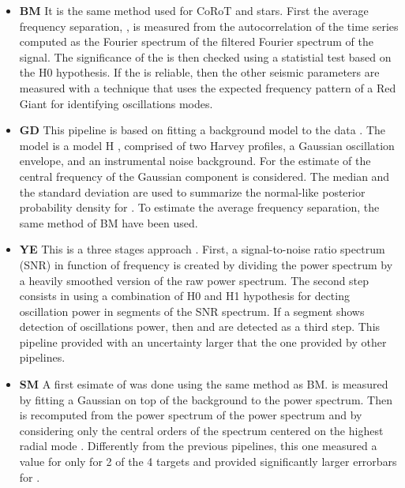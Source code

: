 \documentclass{aa}
\begin{document}
\begin{itemize}
\item {\bf BM} It is the same method used for CoRoT and \kepler stars\citealp{Mosser2009, Mosser2011}. First the average frequency separation, \dnu , is measured from the autocorrelation of the time series computed as the Fourier spectrum of the filtered Fourier spectrum of the signal. The significance of the \Dnu is then checked using a statistial test based on the H0 hypothesis. If the \Dnu is reliable, then the other seismic parameters are measured with a technique that uses the expected frequency pattern of a Red Giant for identifying oscillations modes. 
\item {\bf GD} This pipeline is based on fitting a background model to the data \citep{Davies2016}. The model is a  model H \citep{Kallinger2014}, comprised of two Harvey profiles, a Gaussian oscillation envelope, and an instrumental noise background. For the estimate of \Numax the central frequency of the Gaussian component is considered. The median and the standard deviation are used to summarize the normal-like posterior probability density for \numax. To estimate the average frequency separation, the same method of BM have been used.
\item {\bf YE} This is a three stages approach \cite{Elsworth2017}. First, a signal-to-noise ratio spectrum (SNR) in function of frequency is created by dividing the power spectrum by a heavily smoothed version of the raw power spectrum. The second step consists in using a combination of H0 and H1 hypothesis for decting oscillation power in segments of the SNR spectrum. If a segment shows detection of oscillations power, then \Numax and \Dnu are detected as a third step\cite{Hekker2010}. This pipeline provided \Dnu with an uncertainty larger that the one provided by other pipelines.
\item {\bf SM} A first esimate of \Dnu was done using the same method as BM. \numax is measured by fitting a Gaussian on top of the background to the power spectrum. Then \Dnu is recomputed from the power spectrum of the power spectrum and by considering only the central orders of the spectrum centered on the highest radial mode \citealp{Mathur2010, Mathur2011}. Differently from the previous pipelines, this one measured a value for \Dnu only for 2 of the 4 targets and provided significantly larger errorbars for \numax.
\end{itemize}
\end{document}
